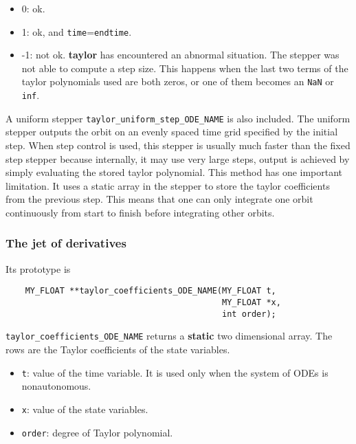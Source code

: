 \documentclass[10pt]{article}
\theoremstyle{remark}
\newcommand{\taylorname}{{\bf taylor}}
\begin{document}
\begin{itemize}
\item 0: ok.
\item 1: ok, and {\tt time}={\tt endtime}.
\item -1: not ok. \taylorname{} has encountered an abnormal
  situation. The stepper was not able to compute a step size. This
  happens when the last two terms of the taylor polynomials used are
  both zeros, or one of them becomes an \verb+NaN+ or \verb+inf+.
\end{itemize}


A uniform stepper \verb+taylor_uniform_step_ODE_NAME+ is also
included. The uniform stepper outputs the orbit on an evenly spaced
time grid specified by the initial step. When step control is used,
this stepper is usually much faster than the fixed step stepper
because internally, it may use very large steps, output is achieved by
simply evaluating the stored taylor polynomial. This method has one
important limitation. It uses a static array in the stepper to store
the taylor coefficients from the previous step. This means that one
can only integrate one orbit continuously from start to finish before
integrating other orbits.

\subsubsection*{The jet of derivatives}
Its prototype is
\begin{verbatim}
    MY_FLOAT **taylor_coefficients_ODE_NAME(MY_FLOAT t,
                                            MY_FLOAT *x,
                                            int order);
\end{verbatim}
\verb+taylor_coefficients_ODE_NAME+ returns a {\bf static} two
dimensional array. The rows are the Taylor coefficients of the state
variables.

\vspace{3mm}
\begin{itemize}
  \item{\verb+t+: value of the time variable. It is used only when the
    system of ODEs is nonautonomous.}
  \item{\verb+x+: value of the state variables.}
  \item{\verb+order+: degree of Taylor polynomial.}
\end{itemize}
\end{document}
